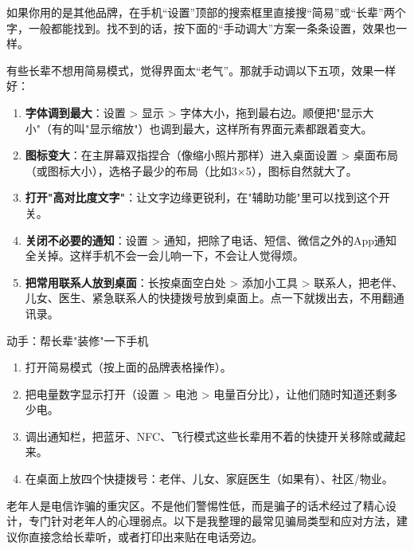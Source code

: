 如果你用的是其他品牌，在手机“设置”顶部的搜索框里直接搜“简易”或“长辈”两个字，一般都能找到。找不到的话，按下面的“手动调大”方案一条条设置，效果也一样。


有些长辈不想用简易模式，觉得界面太“老气”。那就手动调以下五项，效果一样好：

\begin{enumerate}
  \item \textbf{字体调到最大}：设置 > 显示 > 字体大小，拖到最右边。顺便把"显示大小"（有的叫"显示缩放"）也调到最大，这样所有界面元素都跟着变大。
  \item \textbf{图标变大}：在主屏幕双指捏合（像缩小照片那样）进入桌面设置 > 桌面布局（或图标大小），选格子最少的布局（比如3×5），图标自然就大了。
  \item \textbf{打开"高对比度文字"}：让文字边缘更锐利，在"辅助功能"里可以找到这个开关。
  \item \textbf{关闭不必要的通知}：设置 > 通知，把除了电话、短信、微信之外的App通知全关掉。这样手机不会一会儿响一下，不会让人觉得烦。
  \item \textbf{把常用联系人放到桌面}：长按桌面空白处 > 添加小工具 > 联系人，把老伴、儿女、医生、紧急联系人的快捷拨号放到桌面上。点一下就拨出去，不用翻通讯录。
\end{enumerate}

\begin{tcbpractice}{动手：帮长辈"装修"一下手机}
\begin{enumerate}
  \item 打开简易模式（按上面的品牌表格操作）。
  \item 把电量数字显示打开（设置 > 电池 > 电量百分比），让他们随时知道还剩多少电。
  \item 调出通知栏，把蓝牙、NFC、飞行模式这些长辈用不着的快捷开关移除或藏起来。
  \item 在桌面上放四个快捷拨号：老伴、儿女、家庭医生（如果有）、社区/物业。
\end{enumerate}

\end{tcbpractice}


老年人是电信诈骗的重灾区。不是他们警惕性低，而是骗子的话术经过了精心设计，专门针对老年人的心理弱点。以下是我整理的最常见骗局类型和应对方法，建议你直接念给长辈听，或者打印出来贴在电话旁边。


